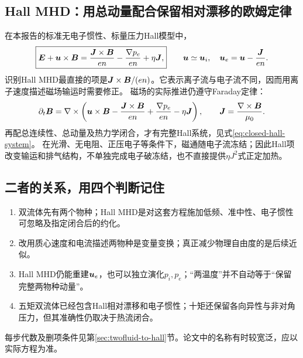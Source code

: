 \documentclass[UTF8,a4paper,11pt,openany,fontset=fandol]{ctexbook}
\begin{document}
\subsection{Hall MHD：用总动量配合保留相对漂移的欧姆定律}
在本报告的标准无电子惯性、标量压力Hall模型中，
\begin{equation}
 \boxed{\bm{E}+\bm{u}\times\bm{B}
   =\frac{\bm{J}\times\bm{B}}{en}-\frac{\nabla p_e}{en}+\eta\bm{J},}
 \qquad \bm{u}\simeq\bm{u}_i,\quad \bm{u}_e=\bm{u}-\frac{\bm{J}}{en}.
 \label{eq:guide-core-hall}
\end{equation}
识别Hall MHD最直接的项是$\bm{J}\times\bm{B}/(en)$。它表示离子流与电子流不同，因而用离子速度描述磁场输运时需要修正。
磁场的实际推进仍遵守Faraday定律：
\begin{equation}
 \partial_t\bm{B}=\nabla\times
 \left(\bm{u}\times\bm{B}-\frac{\bm{J}\times\bm{B}}{en}
                    +\frac{\nabla p_e}{en}-\eta\bm{J}\right),
 \qquad \bm{J}=\frac{\nabla\times\bm{B}}{\mu_0}.
\end{equation}
再配总连续性、总动量及热力学闭合，才有完整Hall系统，见式\eqref{eq:closed-hall-system}。
在光滑、无电阻、正压电子等条件下，磁通随电子流冻结；因此Hall项改变输运和排气结构，不单独完成电子破冻结，也不直接提供$\eta J^2$式正定加热。

\subsection{二者的关系，用四个判断记住}
\begin{enumerate}
\item 双流体先有两个物种；Hall MHD是对这套方程施加低频、准中性、电子惯性可忽略及指定闭合后的约化。
\item 改用质心速度和电流描述两物种是变量变换；真正减少物理自由度的是后续近似。
\item Hall MHD仍能重建$\bm{u}_e$，也可以独立演化$p_i,p_e$；“两温度”并不自动等于“保留完整两物种动量”。
\item 五矩双流体已经包含Hall相对漂移和电子惯性；十矩还保留各向异性与非对角压力，但其准确性仍取决于热流闭合。
\end{enumerate}
每步代数及删项条件见第\ref{sec:twofluid-to-hall}节。论文中的名称有时较宽泛，应以实际方程为准。
\end{document}
